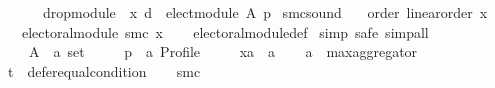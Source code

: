\begin{isabellebody}
\ \ \ \ \ \ {\isacharparenleft}{\kern0pt}drop{\isacharunderscore}{\kern0pt}module\ {}\ x{\isacharparenright}{\kern0pt}{\isacharparenright}{\kern0pt}\ {\isasymcirclearrowleft}\isactrlsub {\isasymexists}\isactrlsub {\isacharbang}{\kern0pt}\isactrlsub d{\isacharparenright}{\kern0pt}\ {\isasymtriangleright}\ elect{\isacharunderscore}{\kern0pt}module{\isacharparenright}{\kern0pt}\ A\ p{\isacharparenright}{\kern0pt}{\isachardoublequoteclose}%
\isadelimdocument
%
\endisadelimdocument
%
\isatagdocument
%
\isamarkuptrue%
%
\endisatagdocument
{\isafolddocument}%
%
\isadelimdocument
%
\endisadelimdocument
{}\isamarkupfalse%
\ smc{\isacharunderscore}{\kern0pt}sound{\isacharcolon}{\kern0pt}\isanewline
\ \ \ order{\isacharcolon}{\kern0pt}\ {\isachardoublequoteopen}linear{\isacharunderscore}{\kern0pt}order\ x{\isachardoublequoteclose}\isanewline
\ \ \ {\isachardoublequoteopen}electoral{\isacharunderscore}{\kern0pt}module\ {\isacharparenleft}{\kern0pt}smc\ x{\isacharparenright}{\kern0pt}{\isachardoublequoteclose}\isanewline
%
\isadelimproof
\ \ %
\endisadelimproof
%
\isatagproof
{}\isamarkupfalse%
\ electoral{\isacharunderscore}{\kern0pt}module{\isacharunderscore}{\kern0pt}def\isanewline
{}\isamarkupfalse%
\ {\isacharparenleft}{\kern0pt}simp{\isacharcomma}{\kern0pt}\ safe{\isacharcomma}{\kern0pt}\ simp{\isacharunderscore}{\kern0pt}all{\isacharparenright}{\kern0pt}\isanewline
\ \ \isamarkupfalse%
\isanewline
\ \ \ \ A\ {\isacharcolon}{\kern0pt}{\isacharcolon}{\kern0pt}\ {\isachardoublequoteopen}{\isacharprime}{\kern0pt}a\ set{\isachardoublequoteclose}\ \isanewline
\ \ \ \ p\ {\isacharcolon}{\kern0pt}{\isacharcolon}{\kern0pt}\ {\isachardoublequoteopen}{\isacharprime}{\kern0pt}a\ Profile{\isachardoublequoteclose}\ \isanewline
\ \ \ \ xa\ {\isacharcolon}{\kern0pt}{\isacharcolon}{\kern0pt}\ {\isachardoublequoteopen}{\isacharprime}{\kern0pt}a{\isachardoublequoteclose}\isanewline
\ \ \isamarkupfalse%
\ {\isacharquery}{\kern0pt}a\ {\isacharequal}{\kern0pt}\ {\isachardoublequoteopen}max{\isacharunderscore}{\kern0pt}aggregator{\isachardoublequoteclose}\isanewline
\ \ \isamarkupfalse%
\ {\isacharquery}{\kern0pt}t\ {\isacharequal}{\kern0pt}\ {\isachardoublequoteopen}defer{\isacharunderscore}{\kern0pt}equal{\isacharunderscore}{\kern0pt}condition{\isachardoublequoteclose}\isanewline
\ \ \isamarkupfalse%
\ {\isacharquery}{\kern0pt}smc\ {\isacharequal}{\kern0pt}\isanewline

\end{isabellebody}
